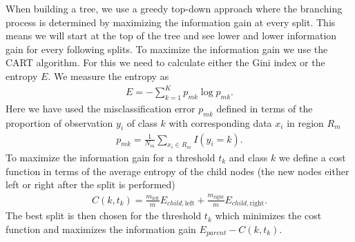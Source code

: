 \documentclass[11pt]{article}
\begin{document}
When building a tree, we use a greedy top-down approach where the branching process is determined by maximizing the information gain at every split. This means we will start at the top of the tree and see lower and lower information gain for every following splits. To maximize the information gain we use the CART algorithm. For this we need to calculate either the Gini index or the entropy $E$. We measure the entropy as
\begin{align*}
    E = - \sum_{k=1}^K p_{mk}\log p_{mk}.
\end{align*}
Here we have used the misclassification error $p_{mk}$ defined in terms of the proportion of observation $y_i$ of class $k$ with corresponding data $x_i$ in region $R_m$
\begin{align*}
    p_{mk} = \frac{1 }{N_m }\sum_{x_i \in R_m} I (y_i = k).
\end{align*}
To maximize the information gain for a threshold $t_k$ and class $k$ we define a cost function in terms of the average entropy of the child nodes (the new nodes either left or right after the split is performed)
\begin{align*}
    C(k, t_k ) = \frac{m_{\text{left}}}{m} E_{child,\text{left}} + \frac{m_{\text{right}}}{m}E_{child,\text{right}}.
\end{align*}
The best split is then chosen for the threshold $t_k$ which minimizes the cost function and maximizes the information gain $E_{parent} - C(k, t_k)$.
\end{document}
